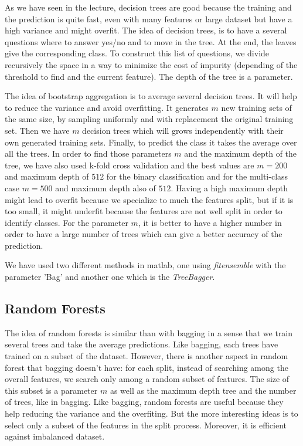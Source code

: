 \documentclass{article} %
\begin{document}
As we have seen in the lecture, decision trees are good because the training and the prediction is quite fast, even with many features or large dataset but have a high variance and might overfit. The idea of decision trees, is to have a several questions where to answer yes/no and to move in the tree. At the end, the leaves give the corresponding class. To construct this list of questions, we divide recursively the space in a way to minimize the cost of impurity (depending of the threshold to find and the current feature). The depth of the tree is a parameter.

The idea of bootstrap aggregation is to average several decision trees. It will help to reduce the variance and avoid overfitting. It generates $m$ new training sets of the same size, by sampling uniformly and with replacement the original training set. Then we have $m$ decision trees which will grows independently with their own generated training sets. Finally, to predict the class it takes the average over all the trees. In order to find those parameters $m$ and the maximum depth of the tree, we have also used k-fold cross validation and the best values are $m = 200$ and maximum depth of $512$ for the binary classification and for the multi-class case $m = 500$ and maximum depth also of $512$. Having a high maximum depth might lead to overfit because we specialize to much the features split, but if it is too small, it might underfit because the features are not well split in order to identify classes. For the parameter $m$, it is better to have a higher number in order to have a large number of trees which can give a better accuracy of the prediction.

We have used two different methods in matlab, one using \textit{fitensemble} with the parameter 'Bag' and another one which is the \textit{TreeBagger}.

\subsection{Random Forests}

The idea of random forests is similar than with bagging in a sense that we train several trees and take the average predictions. Like bagging, each trees have trained on a subset of the dataset. However, there is another aspect in random forest that bagging doesn't have: for each split, instead of searching among the overall features, we search only among a random subset of features. The size of this subset is a parameter $m$ as well as the maximum depth tree and the number of trees, like in bagging. Like bagging, random forests are useful because they help reducing the variance and the overfiting. But the more interesting ideas is to select only a subset of the features in the split process. Moreover, it is efficient against imbalanced dataset.
\end{document}
